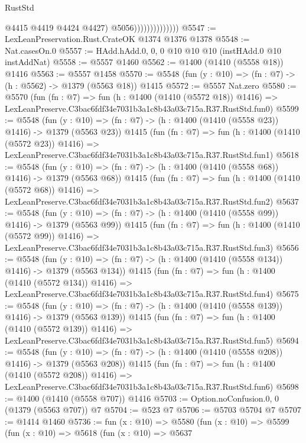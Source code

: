\begin{lexlean}{RustStd}
\begin{coremodule}
                                  @4415
                                  @4419
                                  @4424
                                  @4427)
                                @5056))))))))))))))
@5547 := LexLeanPreservation.Rust.CrateOK @1374 @1376 @1378
@5548 := Nat.casesOn.{0}
@5557 := HAdd.hAdd.{0, 0, 0} @10 @10 @10 (instHAdd.{0} @10 instAddNat)
@5558 := @5557 @1460
@5562 := @1400 (@1410 (@5558 @18)) @1416
@5563 := @5557 @1458
@5570 := @5548 (fun (y : @10) => (fn : @7) -> (h : @5562) -> @1379 (@5563 @18)) @1415
@5572 := @5557 Nat.zero
@5580 := @5570
    (fun (fn : @7) =>
    fun (h : @1400 (@1410 (@5572 @18)) @1416) =>
    LexLeanPreserve.C3bac6fdf34e7031b3a1c8b43a03c715a.R37.RustStd.fun0)
@5599 := @5548
    (fun (y : @10) => (fn : @7) -> (h : @1400 (@1410 (@5558 @23)) @1416) -> @1379 (@5563 @23))
    @1415
    (fun (fn : @7) =>
    fun (h : @1400 (@1410 (@5572 @23)) @1416) =>
    LexLeanPreserve.C3bac6fdf34e7031b3a1c8b43a03c715a.R37.RustStd.fun1)
@5618 := @5548
    (fun (y : @10) => (fn : @7) -> (h : @1400 (@1410 (@5558 @68)) @1416) -> @1379 (@5563 @68))
    @1415
    (fun (fn : @7) =>
    fun (h : @1400 (@1410 (@5572 @68)) @1416) =>
    LexLeanPreserve.C3bac6fdf34e7031b3a1c8b43a03c715a.R37.RustStd.fun2)
@5637 := @5548
    (fun (y : @10) => (fn : @7) -> (h : @1400 (@1410 (@5558 @99)) @1416) -> @1379 (@5563 @99))
    @1415
    (fun (fn : @7) =>
    fun (h : @1400 (@1410 (@5572 @99)) @1416) =>
    LexLeanPreserve.C3bac6fdf34e7031b3a1c8b43a03c715a.R37.RustStd.fun3)
@5656 := @5548
    (fun (y : @10) => (fn : @7) -> (h : @1400 (@1410 (@5558 @134)) @1416) -> @1379 (@5563 @134))
    @1415
    (fun (fn : @7) =>
    fun (h : @1400 (@1410 (@5572 @134)) @1416) =>
    LexLeanPreserve.C3bac6fdf34e7031b3a1c8b43a03c715a.R37.RustStd.fun4)
@5675 := @5548
    (fun (y : @10) => (fn : @7) -> (h : @1400 (@1410 (@5558 @139)) @1416) -> @1379 (@5563 @139))
    @1415
    (fun (fn : @7) =>
    fun (h : @1400 (@1410 (@5572 @139)) @1416) =>
    LexLeanPreserve.C3bac6fdf34e7031b3a1c8b43a03c715a.R37.RustStd.fun5)
@5694 := @5548
    (fun (y : @10) => (fn : @7) -> (h : @1400 (@1410 (@5558 @208)) @1416) -> @1379 (@5563 @208))
    @1415
    (fun (fn : @7) =>
    fun (h : @1400 (@1410 (@5572 @208)) @1416) =>
    LexLeanPreserve.C3bac6fdf34e7031b3a1c8b43a03c715a.R37.RustStd.fun6)
@5698 := @1400 (@1410 (@5558 @707)) @1416
@5703 := Option.noConfusion.{0, 0} (@1379 (@5563 @707)) @7
@5704 := @523 @7
@5706 := @5703 @5704 @7
@5707 := @1414 @1460
@5736 := fun (x : @10) =>
  @5580
    (fun (x : @10) =>
    @5599
      (fun (x : @10) =>
      @5618
        (fun (x : @10) =>
        @5637

\end{coremodule}
\end{lexlean}
